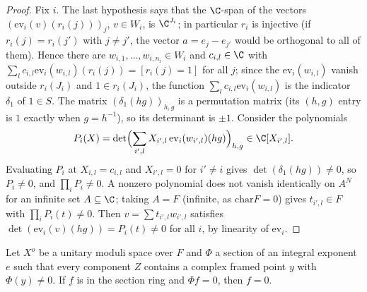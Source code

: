 \begin{proof}
Fix $i$. The last hypothesis says that the $\C$-span of the vectors
$(\mathrm{ev}_i(v)(r_i(j)))_j$, $v\in W_i$, is $\C^{J_i}$; in particular $r_i$ is injective (if
$r_i(j)=r_i(j')$ with $j\ne j'$, the vector $a=e_j-e_{j'}$ would be orthogonal to all of them). Hence there
are $w_{i,1},\dots,w_{i,n_i}\in W_i$ and $c_{i,l}\in\C$ with
$\sum_lc_{i,l}\mathrm{ev}_i(w_{i,l})(r_i(j))=[r_i(j)=1]$ for all $j$; since the
$\mathrm{ev}_i(w_{i,l})$ vanish outside $r_i(J_i)$ and $1\in r_i(J_i)$, the function
$\sum_lc_{i,l}\mathrm{ev}_i(w_{i,l})$ is the indicator $\delta_1$ of $1\in S$. The matrix
$(\delta_1(hg))_{h,g}$ is a permutation matrix (its $(h,g)$ entry is $1$ exactly when $g=h^{-1}$), so
its determinant is $\pm1$. Consider the polynomials
\[
P_i(X)=\det\Bigl(\sum_{i',l}X_{i',l}\,\mathrm{ev}_i(w_{i',l})(hg)\Bigr)_{h,g}\in\C[X_{i',l}].
\]
Evaluating $P_i$ at $X_{i,l}=c_{i,l}$ and $X_{i',l}=0$ for $i'\ne i$ gives $\det(\delta_1(hg))\ne0$, so
$P_i\ne0$, and $\prod_iP_i\ne0$. A nonzero polynomial does not vanish identically on $A^N$ for an infinite
set $A\subseteq\C$; taking $A=F$ (infinite, as $\mathrm{char}F=0$) gives $t_{i',l}\in F$ with
$\prod_iP_i(t)\ne0$. Then $v=\sum t_{i',l}w_{i',l}$ satisfies
$\det(\mathrm{ev}_i(v)(hg))=P_i(t)\ne0$ for all $i$, by linearity of $\mathrm{ev}_i$.
\end{proof}

\begin{lemma}\label{pf:lift1:nzd}
Let $X^o$ be a unitary moduli space over $F$ and $\Phi$ a section of an integral exponent $e$ such that
every component $Z$ contains a complex framed point $y$ with $\Phi(y)\ne0$. If $f$ is in the section
ring and $\Phi f=0$, then $f=0$.
\end{lemma}

